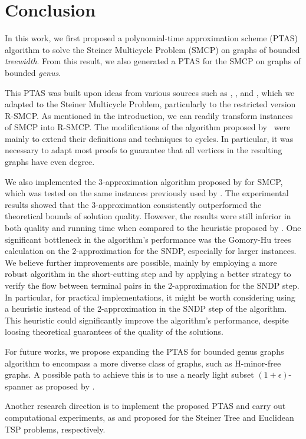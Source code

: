 \chapter{Conclusion}
\label{chapter:conclusion}

In this work, we first proposed a polynomial-time approximation scheme (PTAS) algorithm to solve the Steiner Multicycle Problem (SMCP) on graphs of bounded \textit{treewidth}. From this result, we also generated a PTAS for the SMCP on graphs of bounded \textit{genus}.

This PTAS was built upon ideas from various sources such as \cite{Borradaile2009b}, \cite{Borradaile2012}, and \cite{Bateni}, which we adapted to the Steiner Multicycle Problem, particularly to the restricted version R-SMCP. 
As mentioned in the introduction, we can readily transform instances of SMCP into R-SMCP.
The modifications of the algorithm proposed by~\citeauthor{Bateni} were mainly to extend their definitions and techniques to cycles. 
In particular, it was necessary to adapt most proofs to guarantee that all vertices in the resulting graphs have even degree.   

We also implemented the 3-approximation algorithm proposed by \cite{smcp_3apx} for SMCP, which was tested on the same instances previously used by \cite{Pereira2018TheSM}. 
The experimental results showed that the 3-approximation consistently outperformed the theoretical bounds of solution quality. However, the results were still inferior in both quality and running time when compared to the heuristic proposed by \cite{Pereira2018TheSM}.
One significant bottleneck in the algorithm's performance was the Gomory-Hu trees calculation on the 2-approximation for the SNDP, especially for larger instances.
We believe further improvements are possible, mainly by employing a more robust algorithm in the short-cutting step and by applying a better strategy to verify the flow between terminal pairs in the 2-approximation for the SNDP step.
In particular, for practical implementations, it might be worth considering using a heuristic instead of the 2-approximation in the SNDP step of the algorithm. This heuristic could significantly improve the algorithm's performance, despite loosing theoretical guarantees of the quality of the solutions.

For future works, we propose expanding the PTAS for bounded genus graphs algorithm to encompass a more diverse class of graphs, such as H-minor-free graphs. A possible path to achieve this is to use a nearly light subset \((1 + \epsilon)\)-spanner as proposed by \cite{light_spanners_tsp}.

Another research direction is to implement the proposed PTAS and carry out computational experiments, as \cite{TazariLargeConstants} and \cite{implementationPTASeuclidianTSP} proposed for the Steiner Tree and Euclidean TSP problems, respectively.

